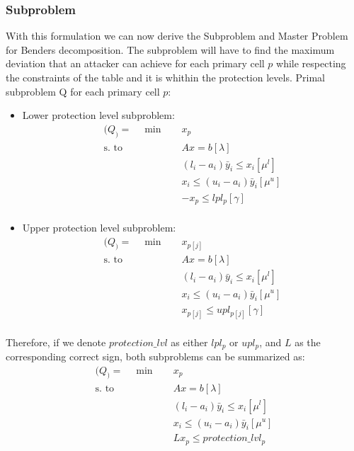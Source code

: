 \documentclass[11pt,a4paper]{article}
\begin{document}
\subsubsection{Subproblem} \label{sec:subproblem-formulation}
With this formulation we can now derive the Subproblem and Master Problem for Benders decomposition.
The subproblem will have to find the maximum deviation that an attacker can achieve for each primary cell $p$ while respecting the constraints of the table and it is whithin the protection levels.
Primal subproblem Q for each primary cell $p$:
\begin{itemize}
    \item Lower protection level subproblem:
        \begin{align*}
        (Q_) = \quad \min \quad & x_{p} \\
        \text{s. to} \quad & Ax = b [\lambda]\\
        & (l_i - a_i)\bar{y}_i \leq x_{i} [\mu^{l}]\\
        &  x_{i} \leq (u_i - a_i)\bar{y}_i [\mu^{u}]\\
        & -x_{p} \leq  lpl_{p} [\gamma]\\
        \end{align*}


    \item  Upper protection level subproblem:
        \begin{align*}
        (Q_) = \quad \min \quad & x_{p[j]} \\
        \text{s. to} \quad & Ax = b [\lambda]\\
        & (l_i - a_i)\bar{y}_i \leq x_{i} [\mu^{l}]\\
        &  x_{i} \leq (u_i - a_i)\bar{y}_i [\mu^{u}]\\
        & x_{p[j]} \leq  upl_{p[j]}  [\gamma]\\ 
        \end{align*}
\end{itemize}


Therefore, if we denote $protection\_lvl$ as either $lpl_{p}$ or $upl_{p}$, and $L$ as the corresponding correct sign, both subproblems can be summarized as:
\begin{align*}
(Q_) = \quad \min \quad & x_{p} \\
\text{s. to} \quad & Ax = b [\lambda]\\
& (l_i - a_i)\bar{y}_i \leq x_{i} [\mu^{l}]\\
&  x_{i} \leq (u_i - a_i)\bar{y}_i [\mu^{u}]\\
& L x_{p} \leq  protection\_lvl_{p}\\
\end{align*}
\end{document}
